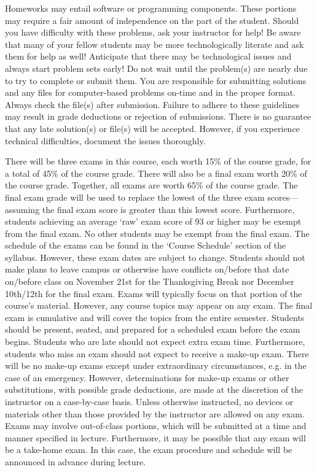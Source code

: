 \documentclass[11pt,letterpaper]{article}
\begin{document}
Homeworks may entail software or programming components. These portions may require a fair amount of independence on the part of the student. Should you have difficulty with these problems, ask your instructor for help! Be aware that many of your fellow students may be more technologically literate and ask them for help as well! Anticipate that there may be technological issues and always start problem sets early! Do not wait until the problem(s) are nearly due to try to complete or submit them. You are responsible for submitting solutions and any files for computer-based problems on-time and in the proper format. Always check the file(s) after submission. Failure to adhere to these guidelines may result in grade deductions or rejection of submissions. There is no guarantee that any late solution(s) or file(s) will be accepted. However, if you experience technical difficulties, document the issues thoroughly. 
\sectionbreak




There will be three exams in this course, each worth 15\% of the course grade, for a total of 45\% of the course grade. There will also be a final exam worth 20\% of the course grade. Together, all exams are worth 65\% of the course grade. The final exam grade will be used to replace the lowest of the three exam scores---assuming the final exam score is greater than this lowest score. Furthermore, students achieving an average `raw' exam score of 93 or higher may be exempt from the final exam. No other students may be exempt from the final exam. The schedule of the exams can be found in the `Course Schedule' section of the syllabus. However, these exam dates are subject to change. Students should not make plans to leave campus or otherwise have conflicts on/before that date on/before class on November 21st for the Thanksgiving Break nor December 10th/12th for the final exam. Exams will typically focus on that portion of the course's material. However, any course topics may appear on any exam. The final exam is cumulative and will cover the topics from the entire semester. Students should be present, seated, and prepared for a scheduled exam before the exam begins. Students who are late should not expect extra exam time. Furthermore, students who miss an exam should not expect to receive a make-up exam. There will be no make-up exams except under extraordinary circumstances, e.g. in the case of an emergency. However, determinations for make-up exams or other substitutions, with possible grade deductions, are made at the discretion of the instructor on a case-by-case basis. Unless otherwise instructed, no devices or materials other than those provided by the instructor are allowed on any exam. Exams may involve out-of-class portions, which will be submitted at a time and manner specified in lecture. Furthermore, it may be possible that any exam will be a take-home exam. In this case, the exam procedure and schedule will be announced in advance during lecture. 
\sectionbreak
\end{document}
